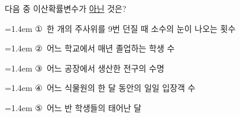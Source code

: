 다음 중 이산확률변수가 \underline{아닌} 것은?
\par\medskip\par\noindent\hangindent=1.4em {\small ①}\ 한 개의 주사위를 9번 던질 때 소수의 눈이 나오는 횟수\par\noindent\hangindent=1.4em {\small ②}\ 어느 학교에서 매년 졸업하는 학생 수\par\noindent\hangindent=1.4em {\small ③}\ 어느 공장에서 생산한 전구의 수명\par\noindent\hangindent=1.4em {\small ④}\ 어느 식물원의 한 달 동안의 일일 입장객 수\par\noindent\hangindent=1.4em {\small ⑤}\ 어느 반 학생들의 태어난 달\par\medskip
